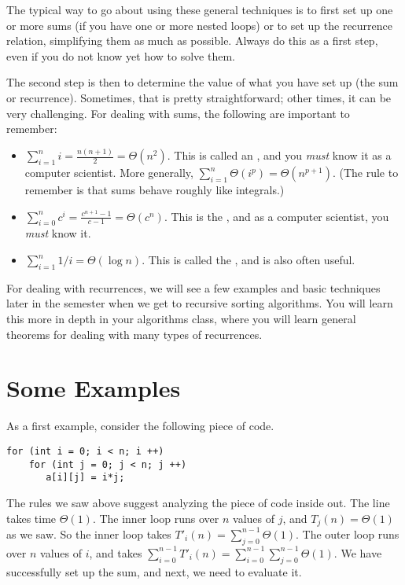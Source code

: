 The typical way to go about using these general techniques is to first
set up one or more sums (if you have one or more nested loops)
or to set up the recurrence relation, simplifying them as much as possible.
Always do this as a first step, even if you do not know yet how to solve them.

The second step is then to determine the value of what you have set up
(the sum or recurrence). Sometimes, that is pretty straightforward;
other times, it can be very challenging.
For dealing with sums, the following are important to remember:

\begin{itemize}
\item $\sum_{i=1}^n i = \frac{n(n+1)}{2} = \Theta(n^2)$.
This is called an , and you \emph{must} know it as a
computer scientist.
More generally, $\sum_{i=1}^n \Theta(i^p) = \Theta(n^{p+1})$.
(The rule to remember is that sums behave roughly like integrals.)
\item $\sum_{i=0}^n c^i = \frac{c^{n+1}-1}{c-1} = \Theta(c^n)$.
This is the , and as a computer scientist, you
\emph{must} know it.
\item $\sum_{i=1}^n 1/i = \Theta(\log n)$.
  This is called the , and is also often useful.
\end{itemize}

For dealing with recurrences, we will see a few examples and basic
techniques later in the semester when we get to recursive sorting
algorithms.
You will learn this more in depth in your algorithms class, where you
will learn general theorems for dealing with many types of recurrences.

\section{Some Examples}
As a first example, consider the following piece of code.
\begin{verbatim}
for (int i = 0; i < n; i ++)
    for (int j = 0; j < n; j ++)
       a[i][j] = i*j;
\end{verbatim}
The rules we saw above suggest analyzing the piece of code inside out.
The line  takes time $\Theta(1)$.
The inner loop runs over $n$ values of $j$, and $T_j(n) = \Theta(1)$
as we saw. 
So the inner loop takes $T'_i(n) = \sum_{j=0}^{n-1} \Theta(1)$.
The outer loop runs over $n$ values of $i$, and takes
$\sum_{i=0}^{n-1} T'_i(n) = \sum_{i=0}^{n-1} \sum_{j=0}^{n-1} \Theta(1)$.
We have successfully set up the sum, and next, we need to evaluate it.

